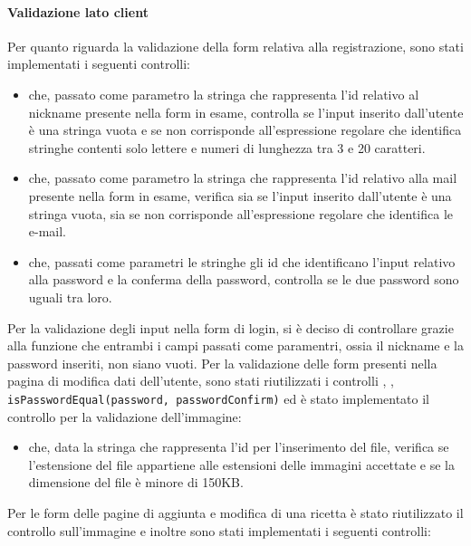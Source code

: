 \paragraph{Validazione lato client}\label{par:validazione_lato_client}
Per quanto riguarda la validazione della form relativa alla registrazione, sono stati implementati i seguenti controlli:
\begin{itemize}
	\item {} che, passato come parametro la stringa che rappresenta l'id relativo al nickname presente nella form in esame, controlla se l'input inserito dall'utente è una stringa vuota e se non corrisponde all'espressione regolare che identifica stringhe contenti solo lettere e numeri di lunghezza tra 3 e 20 caratteri.
	\item {} che, passato come parametro la stringa che rappresenta l'id relativo alla mail presente nella form in esame, verifica sia se l'input inserito dall'utente è una stringa vuota, sia se non corrisponde all'espressione regolare che identifica le e-mail.
	\item {} che, passati come parametri le stringhe gli id che identificano l'input relativo alla password e la conferma della password, controlla se le due password sono uguali tra loro.
\end{itemize}
Per la validazione degli input nella form di login, si è deciso di controllare grazie alla funzione  che entrambi i campi passati come paramentri, ossia il nickname e la password inseriti, non siano vuoti. \newline
Per la validazione delle form presenti nella pagina di modifica dati dell'utente, sono stati riutilizzati i controlli , , \texttt{isPasswordEqual(password, passwordConfirm)} ed è stato implementato il controllo per la validazione dell'immagine:
\begin{itemize}
	\item {} che, data la stringa che rappresenta l'id per l'inserimento del file, verifica se l'estensione del file appartiene alle estensioni delle immagini accettate e se la dimensione del file è minore di 150KB.
\end{itemize}
Per le form delle pagine di aggiunta e modifica di una ricetta è stato riutilizzato il controllo sull'immagine e inoltre sono stati implementati i seguenti controlli:
